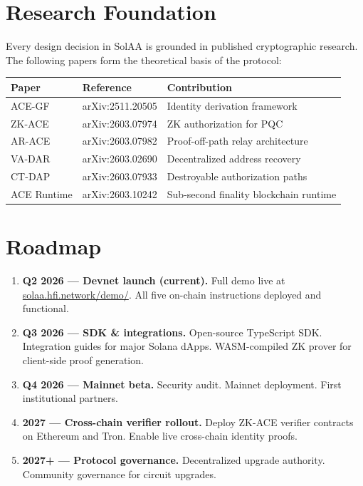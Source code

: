 \documentclass[11pt, a4paper]{article}
\begin{document}
\section{Research Foundation}

Every design decision in SolAA is grounded in published cryptographic research.
The following papers form the theoretical basis of the protocol:

\begin{center}
\begin{tabular}{lll}
  \toprule
  \textbf{Paper} & \textbf{Reference} & \textbf{Contribution} \\
  \midrule
  ACE-GF & arXiv:2511.20505 & Identity derivation framework \\
  ZK-ACE & arXiv:2603.07974 & ZK authorization for PQC \\
  AR-ACE & arXiv:2603.07982 & Proof-off-path relay architecture \\
  VA-DAR & arXiv:2603.02690 & Decentralized address recovery \\
  CT-DAP & arXiv:2603.07933 & Destroyable authorization paths \\
  ACE Runtime & arXiv:2603.10242 & Sub-second finality blockchain runtime \\
  \bottomrule
\end{tabular}
\end{center}

\section{Roadmap}

\begin{enumerate}
  \item \textbf{Q2 2026 --- Devnet launch (current).}
    Full demo live at \href{https://solaa.hfi.network/demo/}{solaa.hfi.network/demo/}.
    All five on-chain instructions deployed and functional.

  \item \textbf{Q3 2026 --- SDK \& integrations.}
    Open-source TypeScript SDK. Integration guides for major Solana dApps.
    WASM-compiled ZK prover for client-side proof generation.

  \item \textbf{Q4 2026 --- Mainnet beta.}
    Security audit. Mainnet deployment. First institutional partners.

  \item \textbf{2027 --- Cross-chain verifier rollout.}
    Deploy ZK-ACE verifier contracts on Ethereum and Tron.
    Enable live cross-chain identity proofs.

  \item \textbf{2027+ --- Protocol governance.}
    Decentralized upgrade authority. Community governance for circuit upgrades.
\end{enumerate}
\end{document}
